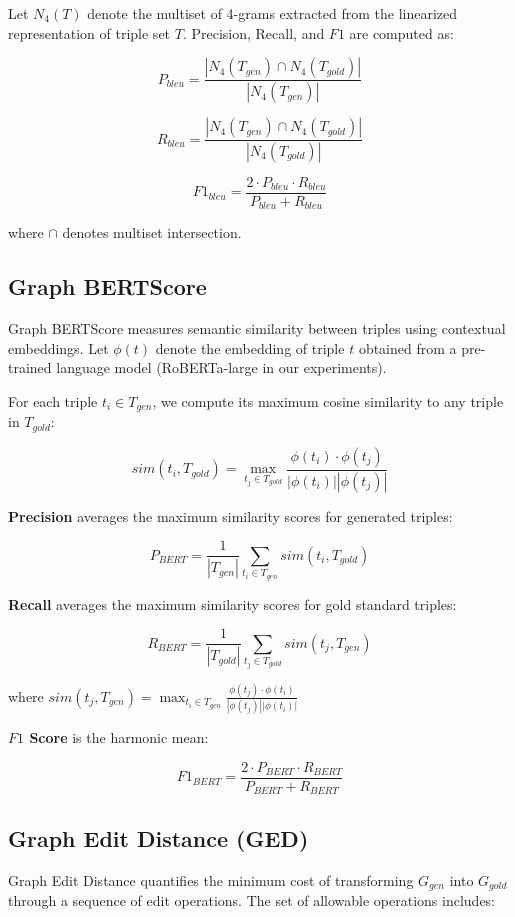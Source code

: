 \documentclass[preprint,12pt]{elsarticle}
\begin{document}
Let $N_4(T)$ denote the multiset of 4-grams extracted from the linearized representation of triple set $T$. Precision, Recall, and $F1$ are computed as:

$$
P_{bleu} = \frac{|N_4(T_{gen}) \cap N_4(T_{gold})|}{|N_4(T_{gen})|}
$$

$$
R_{bleu} = \frac{|N_4(T_{gen}) \cap N_4(T_{gold})|}{|N_4(T_{gold})|}
$$

$$
F1_{bleu} = \frac{2 \cdot P_{bleu} \cdot R_{bleu}}{P_{bleu} + R_{bleu}}
$$

where $\cap$ denotes multiset intersection.

\subsection{Graph BERTScore}\label{app2_4}
Graph BERTScore measures semantic similarity between triples using contextual embeddings. Let $\phi(t)$ denote the embedding of triple $t$ obtained from a pre-trained language model (RoBERTa-large in our experiments).

For each triple $t_i \in T_{gen}$, we compute its maximum cosine similarity to any triple in $T_{gold}$:

$$
sim(t_i, T_{gold}) = \max_{t_j \in T_{gold}} \frac{\phi(t_i) \cdot \phi(t_j)}{|\phi(t_i)| |\phi(t_j)|}
$$

\textbf{Precision} averages the maximum similarity scores for generated triples:

$$
P_{BERT} = \frac{1}{|T_{gen}|} \sum_{t_i \in T_{gen}} sim(t_i, T_{gold})
$$

\textbf{Recall} averages the maximum similarity scores for gold standard triples:

$$
R_{BERT} = \frac{1}{|T_{gold}|} \sum_{t_j \in T_{gold}} sim(t_j, T_{gen})
$$

where $sim(t_j, T_{gen}) = \max_{t_i \in T_{gen}} \frac{\phi(t_j) \cdot \phi(t_i)}{|\phi(t_j)| |\phi(t_i)|}$

\textbf{$F1$ Score} is the harmonic mean:

$$
F1_{BERT} = \frac{2 \cdot P_{BERT} \cdot R_{BERT}}{P_{BERT} + R_{BERT}}
$$

\subsection{Graph Edit Distance (GED)}\label{app2_5}
Graph Edit Distance quantifies the minimum cost of transforming $G_{gen}$ into $G_{gold}$ through a sequence of edit operations. The set of allowable operations includes:
\end{document}
